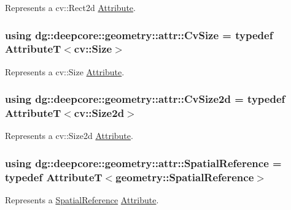 Represents a {\ttfamily cv\+::\+Rect2d} \hyperlink{classdg_1_1deepcore_1_1_attribute}{Attribute}. 

\subsubsection[{\texorpdfstring{Cv\+Size}{CvSize}}]{\setlength{\rightskip}{0pt plus 5cm}using {\bf dg\+::deepcore\+::geometry\+::attr\+::\+Cv\+Size} = typedef AttributeT$<$cv\+::\+Size$>$}\hypertarget{group___geometry_attributes_gae0e04903bac2efafa10d940b1d5df9ff}{}\label{group___geometry_attributes_gae0e04903bac2efafa10d940b1d5df9ff}


Represents a {\ttfamily cv\+::\+Size} \hyperlink{classdg_1_1deepcore_1_1_attribute}{Attribute}. 

\subsubsection[{\texorpdfstring{Cv\+Size2d}{CvSize2d}}]{\setlength{\rightskip}{0pt plus 5cm}using {\bf dg\+::deepcore\+::geometry\+::attr\+::\+Cv\+Size2d} = typedef AttributeT$<$cv\+::\+Size2d$>$}\hypertarget{group___geometry_attributes_ga0e6cae95e97b779779d47e2327f55521}{}\label{group___geometry_attributes_ga0e6cae95e97b779779d47e2327f55521}


Represents a {\ttfamily cv\+::\+Size2d} \hyperlink{classdg_1_1deepcore_1_1_attribute}{Attribute}. 

\subsubsection[{\texorpdfstring{Spatial\+Reference}{SpatialReference}}]{\setlength{\rightskip}{0pt plus 5cm}using {\bf dg\+::deepcore\+::geometry\+::attr\+::\+Spatial\+Reference} = typedef AttributeT$<$geometry\+::\+Spatial\+Reference$>$}\hypertarget{group___geometry_attributes_gacd86ea85438c9807d4ab646c9f98a5c1}{}\label{group___geometry_attributes_gacd86ea85438c9807d4ab646c9f98a5c1}


Represents a \hyperlink{classdg_1_1deepcore_1_1geometry_1_1_spatial_reference}{Spatial\+Reference} \hyperlink{classdg_1_1deepcore_1_1_attribute}{Attribute}. 

